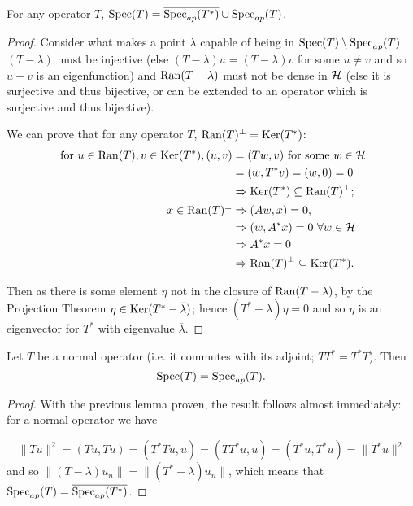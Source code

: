 \documentclass[../main.tex]{subfiles}
\begin{document}
\begin{lemma}
  For any operator $T$, $\mathrm{Spec}(T) = \overline{\mathrm{Spec}_{ap} (T^*)} \cup \mathrm{Spec}_{ap} (T)$.
\end{lemma}
\begin{proof}
Consider what makes a point $\lambda$ capable of being in $\mathrm{Spec}(T) \setminus
\mathrm{Spec}_{ap}(T)$. $(T - \lambda)$ must be injective (else $(T - \lambda)u
= (T - \lambda)v$ for some $u \neq v$ and so $u-v$ is an eigenfunction)
and $\mathrm{Ran}(T - \lambda)$ must not be dense in $\mathcal{H}$ (else it is
surjective and thus bijective, or can be extended to an operator which
is surjective and thus bijective).

We can prove that for any operator $T$, $\mathrm{Ran}(T)^\perp = \mathrm{Ker}(T^*)$:
\begin{align*}
\text{ for } u \in \mathrm{Ran}(T), v \in \mathrm{Ker}(T^*), (u, v) & = (Tw, v) \text{ for some $w \in \mathcal{H}$} \\
& = (w, T^*v) = (w, 0) = 0 \\
& \Rightarrow \mathrm{Ker}(T^*) \subseteq \mathrm{Ran}(T)^\perp ;\\
x \in \mathrm{Ran}(T)^\perp & \Rightarrow (Aw, x) = 0, \\
& \Rightarrow (w, A^*x) = 0\ \forall w \in \mathcal{H} \\
&  \Rightarrow A^*x = 0 \\
& \Rightarrow \mathrm{Ran}(T)^\perp \subseteq \mathrm{Ker}(T^*).
\end{align*}

Then as there is some element $\eta$ not in the closure of  $\mathrm{Ran}(T - \lambda)$,
by the Projection Theorem $\eta \in \mathrm{Ker}(T^* - \overline{\lambda})$; hence $(T^*
- \overline{\lambda})\eta = 0$ and so $\eta$ is an eigenvector for $T^*$ with
eigenvalue $\overline{\lambda}.$ \end{proof}

\begin{theorem}\label{thm:normal-spec}
\cite{halmos1982hilbert}
  Let $T$ be a normal operator (i.e. it commutes with its adjoint; $TT^* = T^*T$).
  Then $$\mathrm{Spec}(T) = \mathrm{Spec}_{ap}(T).$$
\end{theorem}
\begin{proof}
With the previous lemma proven, the result follows almost immediately: for a normal operator we have

$$\|Tu\|^2 = (Tu, Tu) = (T^*Tu, u) = (TT^*u, u) = (T^*u, T^*u) = \|T^*u\|^2$$
and so $\|(T - \lambda)u_n\| = \|(T^* - \overline{\lambda})u_n\|$,
which means that $\mathrm{Spec}_{ap}(T) = \overline{\mathrm{Spec}_{ap} (T^*)}$. 
\end{proof}
\end{document}
